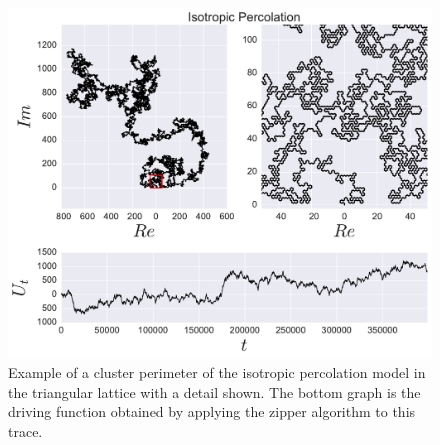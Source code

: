 \begin{figure}
\begin{center}
    \includegraphics[scale=0.5]{chapters/ch6-asle/figs/ip_trdr}
\end{center}
\caption{Example of a cluster perimeter of the isotropic percolation model in
    the triangular lattice with a detail shown. The bottom graph is the driving
    function obtained by applying the zipper algorithm to this trace.}
\label{fig:ip_trdr}
\end{figure}

